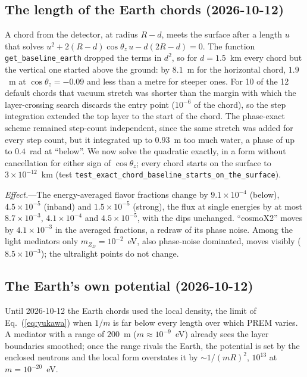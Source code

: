 \documentclass[11pt,a4paper]{article}
\newcommand{\file}[1]{\nolinkurl{#1}}
\newcommand{\mzd}{m_{Z_D}}
\begin{document}
\subsection{The length of the Earth chords (2026-10-12)}
\label{app:baseline}

A chord from the detector, at radius $R-d$, meets the surface after a length $u$ that solves
$u^2 + 2(R-d)\cos\theta_z\,u - d(2R-d) = 0$. The function \texttt{get\_baseline\_earth} dropped
the terms in $d^2$, so for $d = 1.5$~km every chord but the vertical one started above the
ground: by $8.1$~m for the horizontal chord, $1.9$~m at $\cos\theta_z = -0.09$ and less than a
metre for steeper ones. For 10 of the 12 default chords that vacuum stretch was shorter than the
margin with which the layer-crossing search discards the entry point ($10^{-6}$ of the chord), so
the step integration extended the top layer to the start of the chord. The phase-exact scheme
remained step-count independent, since the same stretch was added for every step count, but it
integrated up to $0.93$~m too much water, a phase of up to $0.4$~rad at ``below''. We now solve the quadratic exactly, in a form without
cancellation for either sign of $\cos\theta_z$; every chord starts on the surface to
$3\times10^{-12}$~km (test \file{test_exact_chord_baseline_starts_on_the_surface}).

\textit{Effect.}---The energy-averaged flavor fractions change by $9.1\times10^{-4}$ (below),
$4.5\times10^{-5}$ (inband) and $1.5\times10^{-5}$ (strong), the flux at single energies by at most
$8.7\times10^{-3}$, $4.1\times10^{-4}$ and $4.5\times10^{-5}$, with the dips unchanged. ``cosmoX2''
moves by $4.1\times10^{-3}$ in the averaged fractions, a redraw of its phase noise. Among the light
mediators only $\mzd = 10^{-2}$~eV, also phase-noise dominated, moves visibly ($8.5\times10^{-3}$);
the ultralight points do not change.

\subsection{The Earth's own potential (2026-10-12)}
\label{app:yukawa}

Until 2026-10-12 the Earth chords used the local density, the limit of Eq.~(\ref{eq:yukawa})
when $1/m$ is far below every length over which PREM varies. A mediator with a range of
$200$~m ($m \approx 10^{-9}$~eV) already sees the layer boundaries smoothed; once the range
rivals the Earth, the potential is set by the enclosed neutrons and the local form overstates it
by $\sim1/(mR)^2$, $10^{13}$ at $m = 10^{-20}$~eV.
\end{document}
